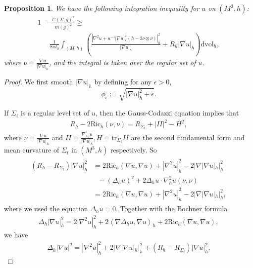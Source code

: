 \documentclass[letter]{amsart}
\newtheorem{prop}[thm]{Proposition}
\theoremstyle{definition}
\theoremstyle{remark}
\def\Ric{\mathrm{Ric}}
\begin{document}
\begin{prop}\label{f-prop}
	We have the following integration inequality for $u$ on $(M^3, h)$:
	\begin{align*}
		1 &- \frac{\mathcal{C}(\Sigma, g) ^2}{m(g)^2} \geq \\
				 &\ \ \frac{1}{8 \pi t_0 }\int_{(M, h)}\left( \frac{\left|\nabla ^2 u + u^{-1}|\nabla u|_h^2 (h - 3 \nu \otimes \nu )\right|_h^2}{|\nabla u|_h} + R_h |\nabla u|_h \right) \mathrm{dvol}_h,
	\end{align*}
	where $\nu = \frac{\nabla u}{|\nabla u|_h}$, and the integral is taken over the regular set of $u$.
\end{prop}
\begin{proof}
We first smooth $|\nabla u|_h$ by defining for any $\epsilon >0$,
$$
\phi _\epsilon := \sqrt{|\nabla u|_h^2 + \epsilon } .
$$

If $\Sigma_t$ is a regular level set of $u$, then the Gauss-Codazzi equation implies that
\begin{align*}
	R_h - 2 \Ric_h\left( \nu , \nu  \right) = R_{\Sigma_t} + |II|^2 - H^2,
\end{align*}
where $\nu = \frac{\nabla u}{|\nabla u|_h}$ and $ II = \frac{\nabla ^2_{\Sigma_t} u}{|\nabla u|_h}, H = \mathrm{tr}_{\Sigma_t} II $ are the second fundamental form and mean curvature of $\Sigma_t$ in $(M^3, h)$ respectively. 
So 
\begin{align}\label{GC}
	\begin{split}
	(R_h - R_{\Sigma_t}) |\nabla u|_h^2 &= 2 \Ric_h( \nabla u, \nabla u) + |\nabla ^2 u|_h^2 - 2 |\nabla |\nabla u|_h |_h^2\\
					  &\ \ \ - (\Delta_h u)^2 + 2 \Delta_h u \cdot \nabla_h ^2 u(\nu , \nu ) \\
	&= 2 \Ric_h( \nabla u, \nabla u) + |\nabla ^2 u|_h^2 - 2 |\nabla |\nabla u|_h |_h^2 ,
\end{split}
\end{align}
where we used the equation $\Delta_h u =0$. Together with the Bochner formula
\begin{align*}
	\Delta_h |\nabla u|_h^2 = 2 |\nabla ^2 u|_h^2 + 2 \left<\nabla \Delta_h u, \nabla u \right>_h +2 \Ric_h(\nabla u, \nabla u),
\end{align*}
we have
\begin{align*}
	\Delta_h |\nabla u|^2 = |\nabla ^2 u|_h^2 + 2|\nabla |\nabla u|_h |_h^2 + (R_h - R_{\Sigma_t}) |\nabla u|_h^2.
\end{align*}


\end{proof}
\end{document}
